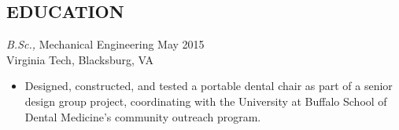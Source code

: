 \documentclass[margin]{res}
\begin{document}
\begin{resume}
\section{EDUCATION} {\sl B.Sc.,} Mechanical Engineering \hfill  May 2015 \\
    Virginia Tech, Blacksburg, VA
    \begin{itemize}  \itemsep -2pt %
        \item Designed, constructed, and tested a portable dental chair as part of a senior design group project, coordinating with the University at Buffalo School of Dental Medicine's community outreach program.
    \end{itemize}
 
 



\end{resume}
\end{document}

